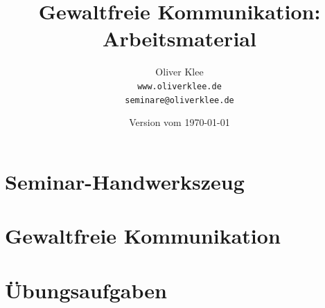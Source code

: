 \documentclass[a4paper,openany,twoside,titlepage,10pt,headsepline]{scrbook}
\title{Gewaltfreie Kommunikation:\\Arbeitsmaterial}
\author{Oliver Klee\\\texttt{www.oliverklee.de}\\\texttt{seminare@oliverklee.de}}
\date{Version vom \today}
\begin{document}
    \frontmatter

    \maketitle

    \tableofcontents


    \mainmatter


    \chapter{Seminar-Handwerkszeug}
    


    \chapter{Gewaltfreie Kommunikation}
    
    
    
    
    
    
    


    \chapter{Übungsaufgaben}
    
    
    

    \backmatter

    
\end{document}
